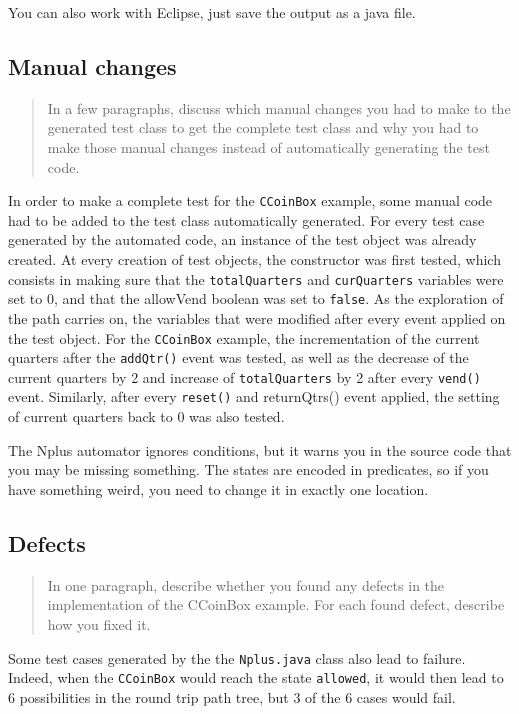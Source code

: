 \documentclass[ieee]{submit}
\begin{document}
You can also work with Eclipse, just save the output as a java file.

\subsection{Manual changes}

\begin{quote}
In a few paragraphs, discuss which manual changes you had to make to the generated test class to get the complete test class and why you had to make those manual changes instead of automatically generating the test code.
\end{quote}

In order to make a complete test for the {\tt CCoinBox} example, some manual code had to be added to the test class automatically generated. For every test case generated by the automated code, an instance of the test object was already created. At every creation of test objects, the constructor was first tested, which consists in making sure that the {\tt totalQuarters} and {\tt curQuarters} variables were set to 0, and that the allowVend boolean was set to {\tt false}. 
As the exploration of the path carries on, the variables that were modified after every event applied on the test object. For the {\tt CCoinBox} example, the incrementation of the current quarters after the {\tt addQtr()} event was tested, as well as the decrease of the current quarters by 2 and increase of {\tt totalQuarters} by 2 after every {\tt vend()} event. Similarly, after every {\tt reset()} and {returnQtrs()} event applied, the setting of current quarters back to 0 was also tested.

The Nplus automator ignores conditions, but it warns you in the source code that you may be missing something. The states are encoded in predicates, so if you have something weird, you need to change it in exactly one location.

\subsection{Defects}

\begin{quote}
In one paragraph, describe whether you found any defects in the implementation of the CCoinBox example. For each found defect, describe how you fixed it.
\end{quote}

Some test cases generated by the the {\tt Nplus.java} class also lead to failure. Indeed, when the {\tt CCoinBox} would reach the state {\tt allowed}, it would then lead to 6 possibilities in the round trip path tree, but 3 of the 6 cases would fail.
\end{document}
